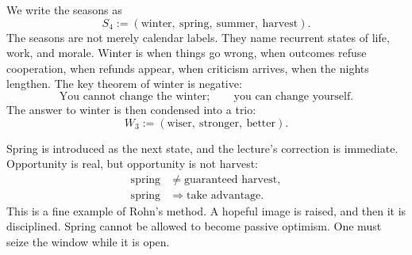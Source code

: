 We write the seasons as
\begin{equation}
S_4 := (\text{winter},\ \text{spring},\ \text{summer},\ \text{harvest}).
\end{equation}
The seasons are not merely calendar labels. They name recurrent states of life, work, and morale. Winter is when things go wrong, when outcomes refuse cooperation, when refunds appear, when criticism arrives, when the nights lengthen. The key theorem of winter is negative:
\begin{equation}
\text{You cannot change the winter};\qquad \text{you can change yourself}.
\end{equation}
The answer to winter is then condensed into a trio:
\begin{equation}
W_3 := (\text{wiser},\ \text{stronger},\ \text{better}).
\end{equation}

\begin{figure}
\begin{center}
\end{center}
\end{figure}

Spring is introduced as the next state, and the lecture's correction is immediate. Opportunity is real, but opportunity is not harvest:
\begin{align}
\text{spring} &\neq \text{guaranteed harvest},\\
\text{spring} &\Rightarrow \text{take advantage}.
\end{align}
This is a fine example of Rohn's method. A hopeful image is raised, and then it is disciplined. Spring cannot be allowed to become passive optimism. One must seize the window while it is open.

